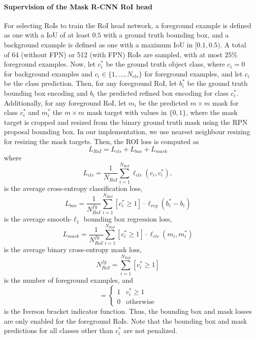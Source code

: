 \paragraph{Supervision of the Mask R-CNN RoI head}
For selecting RoIs to train the RoI head network, a foreground example
is defined as one with a IoU of at least $0.5$ with
a ground truth bounding box, and a background example is defined as
one with a maximum IoU in $[0.1, 0.5)$.
A total of 64 (without FPN) or 512 (with FPN) RoIs are sampled, with
at most $25\%$ foreground examples.
Now, let $c_i^*$ be the ground truth object class, where $c_i = 0$
for background examples and $c_i \in \{1, ..., N_{cls}\}$ for foreground examples,
and let $c_i$ be the class prediction.
Then, for any foreground RoI, let $b_i^*$ be the ground truth bounding box encoding and $b_i$
the predicted refined box encoding for class $c_i^*$.
Additionally, for any foreground RoI, let $m_i$ be the predicted $m \times m$ mask for class $c_i^*$
and $m_i^*$ the $m \times m$ mask target with values in $\{0,1\}$, where the mask target is cropped and resized from
the binary ground truth mask using the RPN proposal bounding box.
In our implementation, we use nearest neighbour resizing for resizing the mask
targets.
Then, the ROI loss is computed as
\begin{equation}
L_{RoI} = L_{cls} + L_{box} + L_{mask}
\end{equation}
where
\begin{equation}
L_{cls} = \frac{1}{N_{RoI}} \sum_{i=1}^{N_{RoI}} \ell_{cls}(c_i, c_i^*),
\end{equation}
is the average cross-entropy classification loss,
\begin{equation}
L_{box} = \frac{1}{N_{RoI}^{fg}} \sum_{i=1}^{N_{RoI}} [c_i^* \geq 1] \cdot \ell_{reg}(b_i^* - b_i)
\end{equation}
is the average smooth-$\ell_1$ bounding box regression loss,
\begin{equation}
L_{mask} = \frac{1}{N_{RoI}^{fg}} \sum_{i=1}^{N_{RoI}} [c_i^* \geq 1] \cdot \ell_{cls}(m_i,m_i^*)
\end{equation}
is the average binary cross-entropy mask loss,
\begin{equation}
N_{RoI}^{fg} = \sum_{i=1}^{N_{RoI}} [c_i^* \geq 1]
\end{equation}
is the number of foreground examples, and
\begin{equation}
[c_i^* \geq 1] =
\begin{cases}
1 &\text{$c_i^* \geq 1$} \\
0 &\text{otherwise}
\end{cases}
\end{equation}
is the Iverson bracket indicator function. Thus, the bounding box and mask
losses are only enabled for the foreground RoIs. Note that the bounding box and mask predictions
for all classes other than $c_i^*$ are not penalized.


